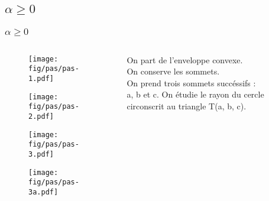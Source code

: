 \documentclass{beamer}
\begin{document}
\subsection{$\alpha \geq 0$}
\begin{frame}
\frametitle{$\alpha \geq 0$}
  \begin{columns}[t]
    \begin{column}{7cm}
      {
        \begin{figure}[h!]
          \centering
          \texttt{[image: fig/pas/pas-1.pdf]}
        \end{figure}
      }
      {
        \begin{figure}[h!]
          \centering
          \texttt{[image: fig/pas/pas-2.pdf]}
        \end{figure}
      }
      {
        \begin{figure}[h!]
          \centering
          \texttt{[image: fig/pas/pas-3.pdf]}
        \end{figure}
      }
      {
        \begin{figure}[h!]
          \centering
          \texttt{[image: fig/pas/pas-3a.pdf]}
        \end{figure}
      }      
    \end{column}
    \begin{column}{3cm}
      \begin{block}{}
        {
          On part de l'enveloppe convexe.\\
        }
        {
          On conserve les sommets.\\
        }
        {
          On prend trois sommets succéssifs :\\
          a, b et c.
        }
        {
          On étudie le rayon du cercle circonscrit au triangle T(a, b, c).\\

        }
      \end{block}  
    \end{column}
  \end{columns} 

\end{frame}
\end{document}
